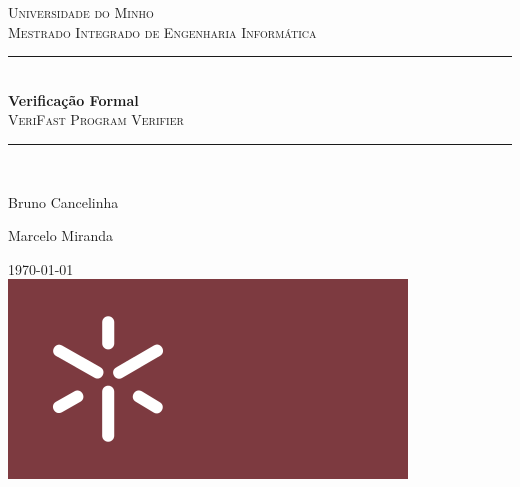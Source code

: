 \documentclass{article}
\begin{document}
\begin{titlepage}

\newcommand{\HRule}{\rule{\linewidth}{0.5mm}} %

\center

\textsc{\LARGE Universidade do Minho}\\[0.7cm]
\textsc{\Large Mestrado Integrado de Engenharia Informática}\\[3cm]

\HRule \\[0.4cm]
{ \huge \bfseries Verificação Formal}\\[0.4cm]
\textsc{\large VeriFast Program Verifier}\\[0.4cm]
\HRule \\[1cm]

\begin{minipage}{\textwidth}
    \centering
    \item Bruno Cancelinha\\
    \item Marcelo Miranda\\
\end{minipage}

\vspace{4cm}
{\large \today}\\[0.5cm]


\includegraphics[scale=0.3]{img/uminho.png}\\[1cm]


\vill

\end{titlepage}

\newpage












\end{document}
